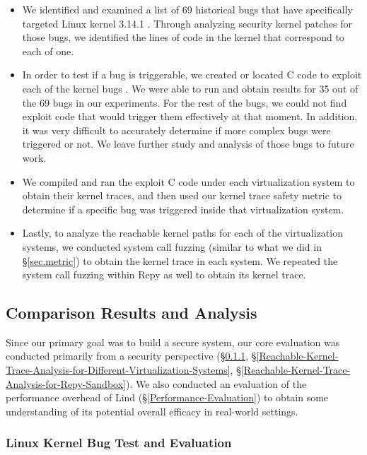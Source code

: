 \begin{itemize}
\item We identified and examined a list of  69 historical bugs that have
specifically 
targeted Linux kernel 3.14.1 \cite{CVE-Datasource}. Through analyzing
security kernel patches for those bugs, 
we identified the lines of code in the kernel that correspond to each of
one.

\item In order to test if a bug is triggerable, we created or located C
code to 
exploit each of the kernel bugs \cite{Exploit-Database}. We were able to
run and obtain results for 
35 out of the 69 bugs in our experiments. For the rest of the bugs, 
we could not find exploit code that would trigger them effectively at that
moment. 
In addition, it was very difficult to accurately determine if more complex
bugs 
were triggered or not. We leave further study and analysis of those bugs to
future work.

\item We compiled and ran the exploit C code under each virtualization
system to 
obtain their kernel traces, and then used our kernel trace safety metric to
determine 
if a specific bug was triggered inside that virtualization system. 

\item Lastly, to  analyze the reachable kernel paths for each of the
virtualization systems, 
we conducted system call fuzzing (similar to what we did in \S{\ref{sec.metric}}) to obtain
the kernel trace in each system. 
We repeated the system call fuzzing within Repy as well to obtain its
kernel trace. 
\end{itemize}

\subsection{Comparison Results and Analysis}

Since our primary goal was to build a secure system, our core evaluation
was conducted primarily 
from a security perspective
(\S{\ref{Linux-Kernel-Bug-Test-and-Evaluation}}, 
\S{\ref{Reachable-Kernel-Trace-Analysis-for-Different-Virtualization-Systems}}, 
\S{\ref{Reachable-Kernel-Trace-Analysis-for-Repy-Sandbox}}). 
We also conducted an evaluation of the performance overhead of Lind
(\S{\ref{Performance-Evaluation}}) 
to obtain some understanding of its potential overall efficacy in
real-world settings.

\subsubsection{Linux Kernel Bug Test and Evaluation}
\label{Linux-Kernel-Bug-Test-and-Evaluation}

